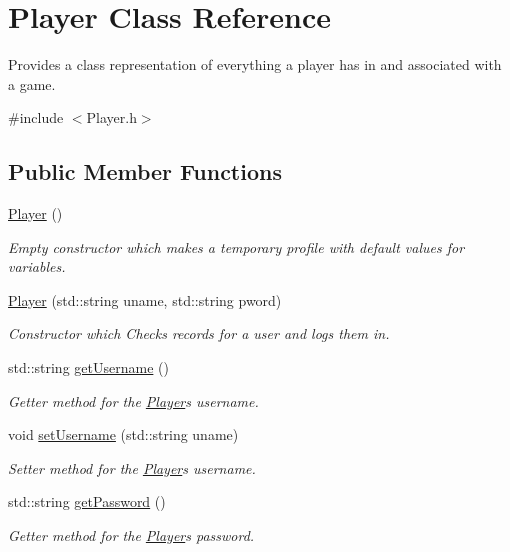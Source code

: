 \hypertarget{classPlayer}{}\section{Player Class Reference}
\label{classPlayer}


Provides a class representation of everything a player has in and associated with a game.  




{\ttfamily \#include $<$Player.\+h$>$}

\subsection*{Public Member Functions}
\begin{DoxyCompactItemize}
\item 
\hyperlink{classPlayer_affe0cc3cb714f6deb4e62f0c0d3f1fd8}{Player} ()
\begin{DoxyCompactList}\small\item\em Empty constructor which makes a temporary profile with default values for variables. \end{DoxyCompactList}\item 
\hyperlink{classPlayer_a61d2a5c3a5f6a6e4a408ba802337af51}{Player} (std\+::string uname, std\+::string pword)
\begin{DoxyCompactList}\small\item\em Constructor which Checks records for a user and logs them in. \end{DoxyCompactList}\item 
std\+::string \hyperlink{classPlayer_a73c00480e9459d52998262f23f6fc5dc}{get\+Username} ()
\begin{DoxyCompactList}\small\item\em Getter method for the \hyperlink{classPlayer}{Player}\textquotesingle{}s username. \end{DoxyCompactList}\item 
void \hyperlink{classPlayer_a8fc488bcda5714ae92466d2936380787}{set\+Username} (std\+::string uname)
\begin{DoxyCompactList}\small\item\em Setter method for the \hyperlink{classPlayer}{Player}\textquotesingle{}s username. \end{DoxyCompactList}\item 
std\+::string \hyperlink{classPlayer_aef0e6355f59ecc9a72dfda313c603b5e}{get\+Password} ()
\begin{DoxyCompactList}\small\item\em Getter method for the \hyperlink{classPlayer}{Player}\textquotesingle{}s password. \end{DoxyCompactList}\item 

\end{DoxyCompactItemize}
